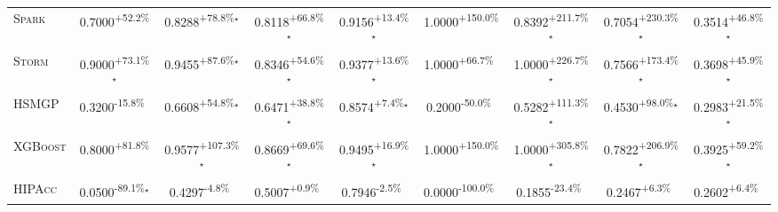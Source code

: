 \begin{table}[htbp]
\begin{tabular}{l|cccc|cccc}
\textsc{Spark} & \cellcolor{green!30}0.7000\textsuperscript{+52.2\%}$^{\,\,\,}$ & \cellcolor{green!30}0.8288\textsuperscript{+78.8\%}$^\star$ & \cellcolor{green!30}0.8118\textsuperscript{+66.8\%}$^\star$ & \cellcolor{green!30}0.9156\textsuperscript{+13.4\%}$^\star$ & \cellcolor{green!30}1.0000\textsuperscript{+150.0\%}$^{\,\,\,}$ & \cellcolor{green!30}0.8392\textsuperscript{+211.7\%}$^\star$ & \cellcolor{green!30}0.7054\textsuperscript{+230.3\%}$^\star$ & \cellcolor{green!30}0.3514\textsuperscript{+46.8\%}$^\star$ \\
\textsc{Storm} & \cellcolor{green!30}0.9000\textsuperscript{+73.1\%}$^\star$ & \cellcolor{green!30}0.9455\textsuperscript{+87.6\%}$^\star$ & \cellcolor{green!30}0.8346\textsuperscript{+54.6\%}$^\star$ & \cellcolor{green!30}0.9377\textsuperscript{+13.6\%}$^\star$ & \cellcolor{green!30}1.0000\textsuperscript{+66.7\%}$^{\,\,\,}$ & \cellcolor{green!30}1.0000\textsuperscript{+226.7\%}$^\star$ & \cellcolor{green!30}0.7566\textsuperscript{+173.4\%}$^\star$ & \cellcolor{green!30}0.3698\textsuperscript{+45.9\%}$^\star$ \\
\textsc{HSMGP} & \cellcolor{red!30}0.3200\textsuperscript{-15.8\%}$^{\,\,\,}$ & \cellcolor{green!30}0.6608\textsuperscript{+54.8\%}$^\star$ & \cellcolor{green!30}0.6471\textsuperscript{+38.8\%}$^\star$ & \cellcolor{green!30}0.8574\textsuperscript{+7.4\%}$^\star$ & \cellcolor{red!30}0.2000\textsuperscript{-50.0\%}$^{\,\,\,}$ & \cellcolor{green!30}0.5282\textsuperscript{+111.3\%}$^\star$ & \cellcolor{green!30}0.4530\textsuperscript{+98.0\%}$^\star$ & \cellcolor{green!30}0.2983\textsuperscript{+21.5\%}$^\star$ \\
\textsc{XGBoost} & \cellcolor{green!30}0.8000\textsuperscript{+81.8\%}$^{\,\,\,}$ & \cellcolor{green!30}0.9577\textsuperscript{+107.3\%}$^\star$ & \cellcolor{green!30}0.8669\textsuperscript{+69.6\%}$^\star$ & \cellcolor{green!30}0.9495\textsuperscript{+16.9\%}$^\star$ & \cellcolor{green!30}1.0000\textsuperscript{+150.0\%}$^{\,\,\,}$ & \cellcolor{green!30}1.0000\textsuperscript{+305.8\%}$^\star$ & \cellcolor{green!30}0.7822\textsuperscript{+206.9\%}$^\star$ & \cellcolor{green!30}0.3925\textsuperscript{+59.2\%}$^\star$ \\
\textsc{HIPAcc} & \cellcolor{red!30}0.0500\textsuperscript{-89.1\%}$^\star$ & \cellcolor{red!30}0.4297\textsuperscript{-4.8\%}$^{\,\,\,}$ & \cellcolor{green!30}0.5007\textsuperscript{+0.9\%}$^{\,\,\,}$ & \cellcolor{red!30}0.7946\textsuperscript{-2.5\%}$^{\,\,\,}$ & \cellcolor{red!30}0.0000\textsuperscript{-100.0\%}$^{\,\,\,}$ & \cellcolor{red!30}0.1855\textsuperscript{-23.4\%}$^{\,\,\,}$ & \cellcolor{green!30}0.2467\textsuperscript{+6.3\%}$^{\,\,\,}$ & \cellcolor{green!30}0.2602\textsuperscript{+6.4\%}$^{\,\,\,}$ \\

\end{tabular}
\end{table}

